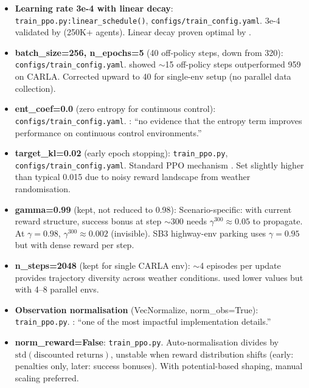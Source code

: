 \documentclass[11pt,a4paper]{article}
\begin{document}
\begin{itemize}[leftmargin=*]
  \item \textbf{Learning rate 3e-4 with linear decay}:
        \texttt{train\_ppo.py:linear\_schedule()},
        \texttt{configs/train\_config.yaml}.
        3e-4 validated by \cite{andrychowicz2021what} (250K+ agents).
        Linear decay proven optimal by \cite{defazio2023road}.

  \item \textbf{batch\_size=256, n\_epochs=5} (40 off-policy steps, down from 320):
        \texttt{configs/train\_config.yaml}.
        \cite{carl2025} showed $\sim$15 off-policy steps outperformed 959 on CARLA.
        Corrected upward to 40 for single-env setup (no parallel data collection).

  \item \textbf{ent\_coef=0.0} (zero entropy for continuous control):
        \texttt{configs/train\_config.yaml}.
        \cite{andrychowicz2021what}: ``no evidence that the entropy term improves
        performance on continuous control environments.''

  \item \textbf{target\_kl=0.02} (early epoch stopping):
        \texttt{train\_ppo.py}, \texttt{configs/train\_config.yaml}.
        Standard PPO mechanism \cite{schulman2017proximal}. Set slightly higher
        than typical 0.015 due to noisy reward landscape from weather randomisation.

  \item \textbf{gamma=0.99} (kept, not reduced to 0.98):
        Scenario-specific: with current reward structure, success bonus at step
        $\sim$300 needs $\gamma^{300} \approx 0.05$ to propagate.
        At $\gamma = 0.98$, $\gamma^{300} \approx 0.002$ (invisible).
        SB3 highway-env parking uses $\gamma = 0.95$ \cite{highwayenv} but with
        dense reward per step.

  \item \textbf{n\_steps=2048} (kept for single CARLA env):
        $\sim$4 episodes per update provides trajectory diversity across weather
        conditions. \cite{carl2025} used lower values but with 4--8 parallel envs.

  \item \textbf{Observation normalisation} (VecNormalize, norm\_obs=True):
        \texttt{train\_ppo.py}.
        \cite{andrychowicz2021what}: ``one of the most impactful implementation details.''

  \item \textbf{norm\_reward=False}:
        \texttt{train\_ppo.py}.
        Auto-normalisation divides by $\text{std}(\text{discounted returns})$,
        unstable when reward distribution shifts (early: penalties only, later:
        success bonuses). With potential-based shaping, manual scaling preferred.
\end{itemize}
\end{document}
